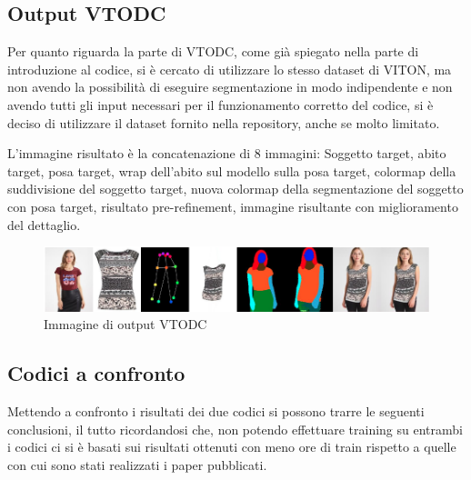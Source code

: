 \documentclass[final, 11pt]{article}
\begin{document}
	\subsection{Output VTODC}
	Per quanto riguarda la parte di VTODC, come già spiegato nella parte di introduzione al codice, si è cercato di utilizzare lo stesso dataset di VITON, ma non avendo la possibilità di eseguire segmentazione in modo indipendente e non avendo tutti gli input necessari per il funzionamento corretto del codice, si è deciso di utilizzare il dataset fornito nella repository, anche se molto limitato.
	
	L’immagine risultato è la concatenazione di 8 immagini: Soggetto target, abito target, posa target, wrap dell’abito sul modello sulla posa target, colormap della suddivisione del soggetto target, nuova colormap della segmentazione del soggetto con posa target, risultato pre-refinement, immagine risultante con miglioramento del dettaglio.
	
	\begin{figure}[!htb]
		\centering
		\includegraphics[width=\linewidth]{res_vtodc.png}
		\caption{Immagine di output VTODC}
	\end{figure} 
	
	\subsection{Codici a confronto}
	Mettendo a confronto i risultati dei due codici si possono trarre le seguenti conclusioni, il  tutto ricordandosi che, non potendo effettuare training su entrambi i codici ci si è basati sui risultati ottenuti con meno ore di train rispetto a quelle con cui sono stati realizzati i paper pubblicati.
	
\end{document}

